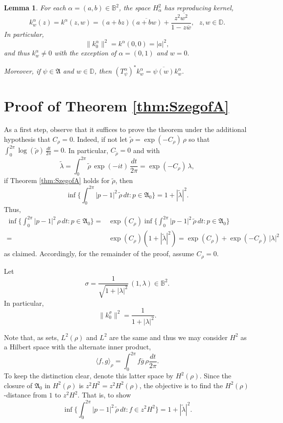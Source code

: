 \documentclass[12pt]{amsart}
\newtheorem{lemma}[theorem]{Lemma}
\theoremstyle{definition}
\theoremstyle{remark}
\numberwithin{equation}{section}
\begin{document}
\begin{lemma}
 \label{lem:ker0}
  For each $\alpha=(a,b)\in {\mathbb{B}^2}$,  the space $H^2_\alpha$ has reproducing kernel,
\[
 k^\alpha_w(z) = k^\alpha(z,w) = (a+bz)\overline{(a+bw)} + \frac{z^2 {\overline{w^2}}}{1-z\overline{w}}, \ \ \ z,w\in {\mathbb D}.
\]
In particular,
\[
\|k^\alpha_0\|^2 = k^{\alpha}(0,0)=|a|^2,
\]
and thus  $k^\alpha_w\ne 0$ with the exception of $\alpha=(0,1)$ and $w=0.$

Moreover, if $\psi\in {\mathfrak{A}}$ and $w\in{\mathbb D}$, then $(T^\alpha_\psi)^* k^\alpha_w = \overline{\psi(w)}k^\alpha_w$.
\end{lemma}

\section{Proof of Theorem \ref{thm:SzegofA}}
As a first step, observe that it suffices to prove the theorem under the additional hypothesis that ${C_{\rho}}=0$.
Indeed, if not let
 ${\tilde{\rho}}=\exp(-{C_{\rho}})\, \rho$ so that  ${\int_{0}^{2\pi}} \log({\tilde{\rho}}) \,{\frac{dt}{2\pi}} =0.$  In particular, $C_{\tilde{\rho}}=0$ and  with
\[
 \tilde{\lambda} = {\int_{0}^{2\pi}} {\tilde{\rho}} \, \exp(-it)\, {\frac{dt}{2\pi}} = \exp(-{C_{\rho}})\,  \lambda,
\]
if Theorem \ref{thm:SzegofA} holds for ${\tilde{\rho}}$, then
\[
 \inf \{ {\int_{0}^{2\pi}} |p-1|^2 \, {\tilde{\rho}} \, dt: p\in {\mathfrak{A}}_0\} = 1+|\tilde{\lambda}|^2.
\]
Thus,
\[
\begin{split}
 \inf \{ {\int_{0}^{2\pi}} |p-1|^2 \, {\rho} \, dt: p\in {\mathfrak{A}}_0\} 
 = &\exp({C_{\rho}}) \inf \{ {\int_{0}^{2\pi}} |p-1|^2 \, {\tilde{\rho}} \, dt: p\in {\mathfrak{A}}_0\}\\
 = & \exp({C_{\rho}}) (1+|\tilde{\lambda}|^2) = \exp({C_{\rho}})+\exp(-{C_{\rho}})\, |\lambda|^2
\end{split}
\]
as claimed.   Accordingly, for the remainder of the proof,  assume ${C_{\rho}}=0$.  

Let
\[
{\sigma} = \frac{1}{\sqrt{1+|\lambda|^2}} \, (1,\lambda) \in {\mathbb{B}^2}.
\]
In particular,
\[
 \|k^{\sigma}_0\|^2 = \frac{1}{1+|\lambda|^2}.
\]

Note that, as sets, $L^2({\rho})$ and $L^2$ are the same and thus we may consider $H^2$ as a Hilbert space 
with the alternate inner product,
\[
 \langle f,g\rangle_{\rho} = {\int_{0}^{2\pi}} f\overline{g}\, {\rho}{\frac{dt}{2\pi}}.
\]
To keep the distinction clear, denote this latter space by $H^2({\rho})$.  
Since the closure of ${\mathfrak{A}}_0$ in $H^2({\rho})$ is $z^2 H^2=z^2 H^2({\rho})$, the objective
is to find the $H^2(\rho)$-distance from $1$ to $z^2 H^2.$ That is, to show
\[
\inf \{ {\int_{0}^{2\pi}} |p-1|^2 \, {\tilde{\rho}} \, dt: f\in z^2 H^2\} = 1+|\tilde{\lambda}|^2.
\]
\end{document}
